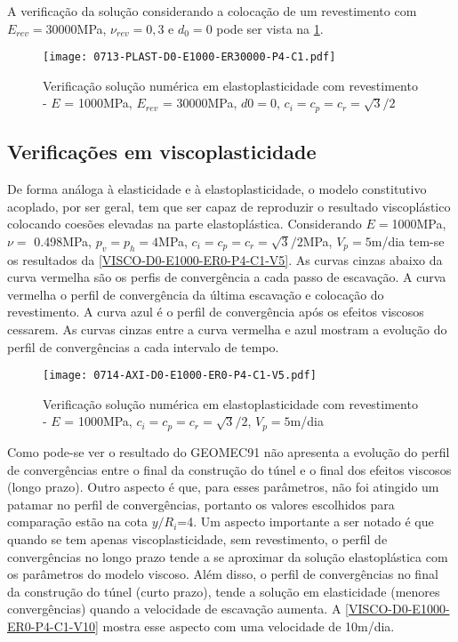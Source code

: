A verificação da solução considerando a colocação de um revestimento com $E_{rev} = 30000$MPa, $\nu_{rev} = 0,3$ e $d_0=0$ pode ser vista na \ref{PLAST-D0-E1000-ER30000-P4-C1}.

\begin{figure}[H]
	\begin{center}
		\texttt{[image: 0713-PLAST-D0-E1000-ER30000-P4-C1.pdf]}
	\end{center}
	\caption{\label{PLAST-D0-E1000-ER30000-P4-C1}Verificação solução numérica em elastoplasticidade com revestimento - $E$ = 1000MPa, $E_{rev}$ = 30000MPa, $d0=0$, $c_i=c_p=c_r=\sqrt{3}/2$}
\end{figure}

\subsection{Verificações em viscoplasticidade}

De forma análoga à elasticidade e à elastoplasticidade, o modelo constitutivo acoplado, por ser geral, tem que ser capaz de reproduzir o resultado viscoplástico colocando coesões elevadas na parte elastoplástica.  Considerando $E =$1000MPa, $\nu =$ 0.498MPa, $p_v = p_h = 4$MPa, $c_i=c_p=c_r = \sqrt{3}/2$MPa, $V_p = 5$m/dia tem-se os resultados da \autoref{VISCO-D0-E1000-ER0-P4-C1-V5}. As curvas cinzas abaixo da curva vermelha são os perfis de convergência a cada passo de escavação. A curva vermelha o perfil de convergência da última escavação e colocação do revestimento. A curva azul é o perfil de convergência após os efeitos viscosos cessarem. As curvas cinzas entre a curva vermelha e azul mostram a evolução do perfil de convergências a cada intervalo de tempo.
\begin{figure}[H]
	\begin{center}
		\texttt{[image: 0714-AXI-D0-E1000-ER0-P4-C1-V5.pdf]}
	\end{center}
	\caption{\label{VISCO-D0-E1000-ER0-P4-C1-V5}Verificação solução numérica em elastoplasticidade com revestimento - $E$ = 1000MPa, $c_i=c_p=c_r=\sqrt{3}/2$, $V_p=5$m/dia}
\end{figure}
Como pode-se ver o resultado do GEOMEC91 não apresenta a evolução do perfil de convergências entre o final da construção do túnel e o final dos efeitos viscosos (longo prazo). Outro aspecto é que, para esses parâmetros, não foi atingido um patamar no perfil de convergências, portanto os valores escolhidos para comparação estão na cota $y/R_i$=4. Um aspecto importante a ser notado é que quando se tem apenas viscoplasticidade, sem revestimento, o perfil de convergências no longo prazo tende a se aproximar da solução elastoplástica com os parâmetros do modelo viscoso. Além disso, o perfil de convergências no final da construção do túnel (curto prazo), tende a solução em elasticidade (menores convergências) quando a velocidade de escavação aumenta. A \autoref{VISCO-D0-E1000-ER0-P4-C1-V10} mostra esse aspecto com uma velocidade de 10m/dia.

